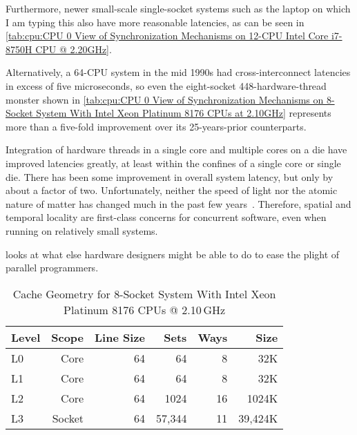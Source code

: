 {{	Furthermore, newer small-scale single-socket systems such
	as the laptop on which I am typing this also have more
	reasonable latencies, as can be seen in
	\cref{tab:cpu:CPU 0 View of Synchronization Mechanisms on 12-CPU Intel Core i7-8750H CPU @ 2.20GHz}.

	Alternatively, a 64-CPU system in the mid 1990s had
	cross-interconnect latencies in excess of five microseconds,
	so even the eight-socket 448-hardware-thread monster shown in
	\cref{tab:cpu:CPU 0 View of Synchronization Mechanisms on 8-Socket System With Intel Xeon Platinum 8176 CPUs at 2.10GHz}
	represents more than a five-fold improvement over its
	25-years-prior counterparts.

	Integration of hardware threads in a single core and multiple
	cores on a die have improved latencies greatly, at least within the
	confines of a single core or single die.
	There has been some improvement in overall system latency,
	but only by about a factor of two.
	Unfortunately, neither the speed of light nor the atomic nature
	of matter has changed much in the past few
	years~\cite{NoBugsHare2016CPUoperations}.
	Therefore, spatial and temporal locality are first-class concerns
	for concurrent software, even when running on relatively
	small systems.

	looks at what else hardware designers might be
	able to do to ease the plight of parallel programmers.
}\QuickQuizEndB
%
\QuickQuizEndE
}                 %

\begin{table}
\renewcommand*{\arraystretch}{1.1}
\centering\small
\begin{tabular}{lrrrrr}
	\toprule
	Level &  Scope & Line Size &   Sets & Ways &    Size \\
	\midrule
	L0    &   Core &        64 &     64 &    8 &     32K \\
	L1    &   Core &        64 &     64 &    8 &     32K \\
	L2    &   Core &        64 &   1024 &   16 &   1024K \\
	L3    & Socket &        64 & 57,344 &   11 & 39,424K \\
	\bottomrule
\end{tabular}
\caption{Cache Geometry for 8-Socket System With Intel Xeon Platinum 8176 CPUs @ 2.10\,GHz}
\label{tab:cpu:Cache Geometry for 8-Socket System With Intel Xeon Platinum 8176 CPUs @ 2.10GHz}
\end{table}


